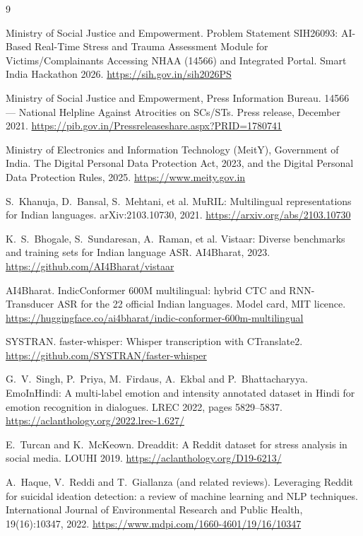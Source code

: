 \documentclass[11pt,a4paper]{article}
\begin{document}
\begin{thebibliography}{9}
\setlength{\itemsep}{3pt}
\small

Ministry of Social Justice and Empowerment.
Problem Statement SIH26093: AI-Based Real-Time Stress and Trauma Assessment Module for
Victims/Complainants Accessing NHAA (14566) and Integrated Portal. Smart India Hackathon 2026.
\url{https://sih.gov.in/sih2026PS}

Ministry of Social Justice and Empowerment, Press Information Bureau.
14566 --- National Helpline Against Atrocities on SCs/STs. Press release, December 2021.
\url{https://pib.gov.in/Pressreleaseshare.aspx?PRID=1780741}

Ministry of Electronics and Information Technology (MeitY), Government of India.
The Digital Personal Data Protection Act, 2023, and the Digital Personal Data Protection Rules, 2025.
\url{https://www.meity.gov.in}

S.~Khanuja, D.~Bansal, S.~Mehtani, et al.
MuRIL: Multilingual representations for Indian languages. arXiv:2103.10730, 2021.
\url{https://arxiv.org/abs/2103.10730}

K.~S.~Bhogale, S.~Sundaresan, A.~Raman, et al.
Vistaar: Diverse benchmarks and training sets for Indian language ASR. AI4Bharat, 2023.
\url{https://github.com/AI4Bharat/vistaar}

AI4Bharat.
IndicConformer 600M multilingual: hybrid CTC and RNN-Transducer ASR for the 22 official Indian
languages. Model card, MIT licence.
\url{https://huggingface.co/ai4bharat/indic-conformer-600m-multilingual}

SYSTRAN. faster-whisper: Whisper transcription with CTranslate2.
\url{https://github.com/SYSTRAN/faster-whisper}

G.~V.~Singh, P.~Priya, M.~Firdaus, A.~Ekbal and P.~Bhattacharyya.
EmoInHindi: A multi-label emotion and intensity annotated dataset in Hindi for emotion recognition in
dialogues. LREC 2022, pages 5829--5837.
\url{https://aclanthology.org/2022.lrec-1.627/}

E.~Turcan and K.~McKeown.
Dreaddit: A Reddit dataset for stress analysis in social media. LOUHI 2019.
\url{https://aclanthology.org/D19-6213/}

A.~Haque, V.~Reddi and T.~Giallanza (and related reviews).
Leveraging Reddit for suicidal ideation detection: a review of machine learning and NLP techniques.
International Journal of Environmental Research and Public Health, 19(16):10347, 2022.
\url{https://www.mdpi.com/1660-4601/19/16/10347}


\end{thebibliography}
\end{document}
